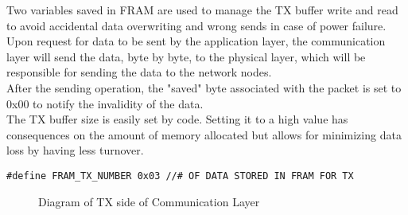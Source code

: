 Two variables saved in FRAM are used to manage the TX buffer write and read to avoid accidental data overwriting and wrong sends in case of power failure.\\
Upon request for data to be sent by the application layer, the communication layer will send the data, byte by byte, to the physical layer, which will be responsible for sending the data to the network nodes.\\
After the sending operation, the "saved" byte associated with the packet is set to 0x00 to notify the invalidity of the data.\\
The TX buffer size is easily set by code. Setting it to a high value has consequences on the amount of memory allocated but allows for minimizing data loss by having less turnover.
\begin{lstlisting}
#define FRAM_TX_NUMBER 0x03 //# OF DATA STORED IN FRAM FOR TX
\end{lstlisting}
  \begin{figure}[H]
    \centerline{}
    \caption{\footnotesize \centering Diagram of TX side of Communication Layer}
    \label{fig:CommunicationLayerTX}
  \end{figure}

